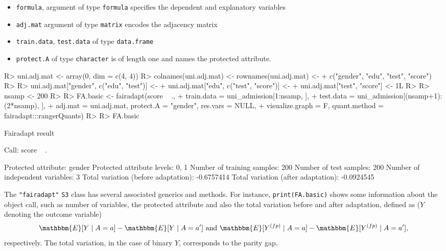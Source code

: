 \documentclass[
  notitle]{jss}
\providecommand{\tightlist}{%
  \setlength{\itemsep}{0pt}\setlength{\parskip}{0pt}}
\begin{document}
\begin{itemize}
\tightlist
\item
  \texttt{formula}, argument of type \texttt{formula} specifies the
  dependent and explanatory variables
\item
  \texttt{adj.mat} argument of type \texttt{matrix} encodes the
  adjacency matrix
\item
  \texttt{train.data}, \texttt{test.data} of type \texttt{data.frame}
\item
  \texttt{protect.A} of type \texttt{character} is of length one and
  names the protected attribute.
\end{itemize}

\begin{CodeChunk}
\begin{CodeInput}
R> uni.adj.mat <- array(0, dim = c(4, 4))
R> colnames(uni.adj.mat) <- rownames(uni.adj.mat) <-
+   c("gender", "edu", "test", "score")
R> 
R> uni.adj.mat["gender", c("edu", "test")] <-
+   uni.adj.mat["edu", c("test", "score")] <-
+   uni.adj.mat["test", "score"] <- 1L
R> 
R> nsamp <- 200
R> 
R> FA.basic <- fairadapt(score ~ .,
+   train.data = uni_admission[1:nsamp, ],
+   test.data = uni_admission[(nsamp+1):(2*nsamp), ],
+   adj.mat = uni.adj.mat, protect.A = "gender", res.vars = NULL,
+   visualize.graph = F, quant.method = fairadapt:::rangerQuants)
R> 
R> FA.basic
\end{CodeInput}
\begin{CodeOutput}
Fairadapt result

Call:
 score ~ . 

Protected attribute:                  gender 
Protected attribute levels:           0, 1 
Number of training samples:           200 
Number of test samples:               200 
Number of independent variables:      3 
Total variation (before adaptation):  -0.6757414 
Total variation (after adaptation):   -0.0924545 
\end{CodeOutput}
\end{CodeChunk}

The \texttt{"fairadapt"} \texttt{S3} class has several associated
generics and methods. For instance, \texttt{print(FA.basic)} shows some
information about the object call, such as number of variables, the
protected attribute and also the total variation before and after
adaptation, defined as (\(Y\) denoting the outcome variable)
\[\mathbbm{E}[Y \mid A = a] - \mathbbm{E}[Y \mid A = a'] \text{ and } \mathbbm{E}[ {Y}^{(fp)} \mid A = a] - \mathbbm{E}[ {Y}^{(fp)} \mid A = a'],\]
respectively. The total variation, in the case of binary \(Y\),
corresponds to the parity gap.
\end{document}
